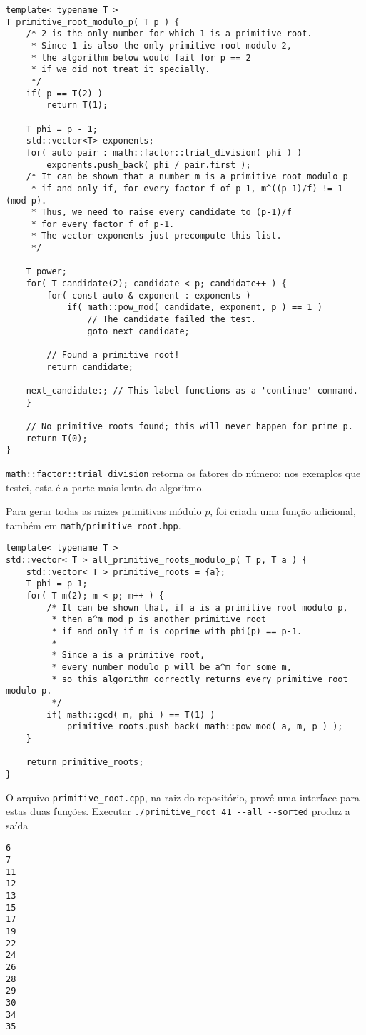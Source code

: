 \documentclass{article}
\theoremstyle{definition}
\begin{document}
\begin{verbatim}
template< typename T >
T primitive_root_modulo_p( T p ) {
    /* 2 is the only number for which 1 is a primitive root.
     * Since 1 is also the only primitive root modulo 2,
     * the algorithm below would fail for p == 2
     * if we did not treat it specially.
     */
    if( p == T(2) )
        return T(1);

    T phi = p - 1;
    std::vector<T> exponents;
    for( auto pair : math::factor::trial_division( phi ) )
        exponents.push_back( phi / pair.first );
    /* It can be shown that a number m is a primitive root modulo p
     * if and only if, for every factor f of p-1, m^((p-1)/f) != 1 (mod p).
     * Thus, we need to raise every candidate to (p-1)/f
     * for every factor f of p-1.
     * The vector exponents just precompute this list.
     */

    T power;
    for( T candidate(2); candidate < p; candidate++ ) {
        for( const auto & exponent : exponents )
            if( math::pow_mod( candidate, exponent, p ) == 1 )
                // The candidate failed the test.
                goto next_candidate;

        // Found a primitive root!
        return candidate;

    next_candidate:; // This label functions as a 'continue' command.
    }

    // No primitive roots found; this will never happen for prime p.
    return T(0);
}
\end{verbatim}

\verb"math::factor::trial_division" retorna os fatores do número;
nos exemplos que testei,
esta é a parte mais lenta do algoritmo.

Para gerar todas as raizes primitivas módulo $p$,
foi criada uma função adicional,
também em \verb"math/primitive_root.hpp".

\begin{verbatim}
template< typename T >
std::vector< T > all_primitive_roots_modulo_p( T p, T a ) {
    std::vector< T > primitive_roots = {a};
    T phi = p-1;
    for( T m(2); m < p; m++ ) {
        /* It can be shown that, if a is a primitive root modulo p,
         * then a^m mod p is another primitive root
         * if and only if m is coprime with phi(p) == p-1.
         *
         * Since a is a primitive root,
         * every number modulo p will be a^m for some m,
         * so this algorithm correctly returns every primitive root modulo p.
         */
        if( math::gcd( m, phi ) == T(1) )
            primitive_roots.push_back( math::pow_mod( a, m, p ) );
    }

    return primitive_roots;
}
\end{verbatim}

O arquivo \verb"primitive_root.cpp",
na raiz do repositório,
provê uma interface para estas duas funções.
Executar \verb"./primitive_root 41 --all --sorted" produz a saída
\begin{verbatim}
6
7
11
12
13
15
17
19
22
24
26
28
29
30
34
35
\end{verbatim}



\end{document}
